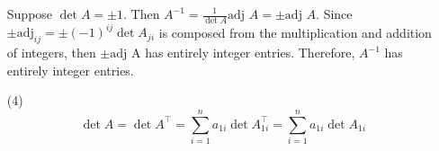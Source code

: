 \documentclass[12pt]{article}
\begin{document}
\begin{itemize}
Suppose $\det A = \pm 1$. Then $A^{-1} = \frac{1}{\det A}\text{adj }A = \pm \text{adj }A$. Since $\pm\text{adj}_{ij} = \pm(-1)^{ij}\det A_{ji}$ is composed from the multiplication and addition of integers, then $\pm \text{adj A}$ has entirely integer entries. Therefore, $A^{-1}$ has entirely integer entries.
\item[(4)]
$$\det A = \det A^\top = \sum_{i=1}^n a_{1i}\det A_{1i}^\top = \sum_{i=1}^n a_{1i}\det A_{1i}$$
\end{itemize}
\end{document}
